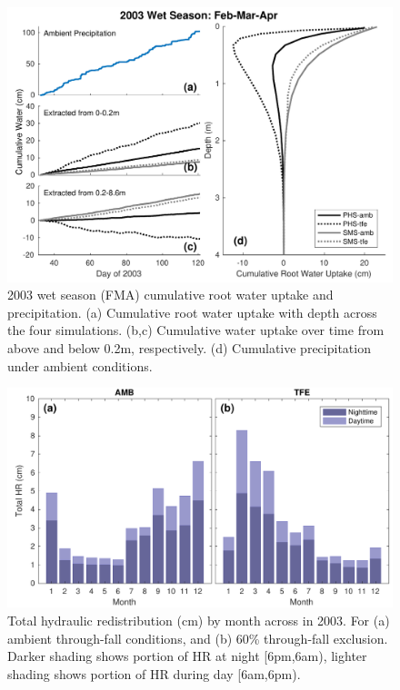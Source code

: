 \documentclass[draft,linenumbers]{agujournal}
\begin{document}
        \clearpage
    \begin{figure}[h]
     \centering
     \includegraphics[width=30pc]{../figs3/qwet.pdf}
     \caption{2003 wet season (FMA) cumulative root water uptake and precipitation. 
     (a) Cumulative root water uptake with depth across the four simulations.
     (b,c) Cumulative water uptake over time from above and below 0.2m, respectively.
     (d) Cumulative precipitation under ambient conditions.
     }
     \label{fig8}
  \end{figure}
  
    \clearpage
    \begin{figure}[h]
     \centering
     \includegraphics[width=30pc]{../figs3/hr.pdf}
     \caption{Total hydraulic redistribution (cm) by month across in 2003. For (a) ambient through-fall conditions, and (b) 60\% through-fall exclusion. 
     Darker shading shows portion of HR at night [6pm,6am), lighter shading shows portion of HR during day [6am,6pm).}
     \label{fig:hr}
  \end{figure}
\end{document}
